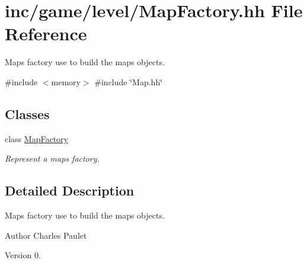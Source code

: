 \hypertarget{MapFactory_8hh}{}\section{inc/game/level/\+Map\+Factory.hh File Reference}
\label{MapFactory_8hh}


Maps\textquotesingle{} factory use to build the maps objects.  


{\ttfamily \#include $<$memory$>$}\newline
{\ttfamily \#include \char`\"{}Map.\+hh\char`\"{}}\newline
\subsection*{Classes}
\begin{DoxyCompactItemize}
\item 
class \hyperlink{classMapFactory}{Map\+Factory}
\begin{DoxyCompactList}\small\item\em Represent a maps\textquotesingle{} factory. \end{DoxyCompactList}\end{DoxyCompactItemize}


\subsection{Detailed Description}
Maps\textquotesingle{} factory use to build the maps objects. 

\begin{DoxyAuthor}{Author}
Charles Paulet 
\end{DoxyAuthor}
\begin{DoxyVersion}{Version}
0. 
\end{DoxyVersion}
